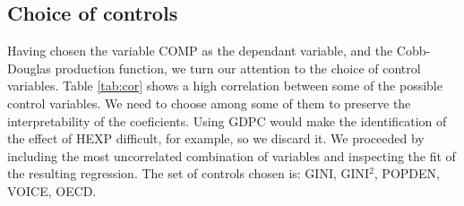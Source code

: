 \documentclass[12pt,a4paper]{article}\usepackage[]{graphicx}\usepackage[]{color}
\begin{document}
\subsection{Choice of controls}
Having chosen the variable COMP as the dependant variable, and the Cobb-Douglas production function, we turn our attention to the choice of control variables. Table \ref{tab:cor} shows a high correlation between some of the possible control variables. We need to choose among some of them to preserve the interpretability of the coeficients. Using GDPC would make the identification of the effect of HEXP difficult, for example, so we discard it. We proceeded by including the most uncorrelated combination of variables and inspecting the fit of the resulting regression. The set of controls chosen is: GINI, GINI$^2$, POPDEN, VOICE, OECD.
\end{document}
